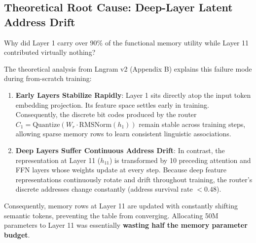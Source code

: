 \documentclass[11pt,a4paper]{article}
\begin{document}
\begin{table}[h!]
\centering
\small
\caption{Wave 1 Step-2000 Memory Zero-Out Sensitivity Probe (20M held-out tokens).}
\label{tab:probe_wave1}
\end{table}

\subsection{Theoretical Root Cause: Deep-Layer Latent Address Drift}
Why did Layer 1 carry over 90\% of the functional memory utility while Layer 11 contributed virtually nothing?

The theoretical analysis from Lngram v2 (Appendix B) explains this failure mode during from-scratch training:
\begin{enumerate}[leftmargin=1.4em, itemsep=2pt]
    \item \textbf{Early Layers Stabilize Rapidly}: Layer 1 sits directly atop the input token embedding projection. Its feature space settles early in training. Consequently, the discrete bit codes produced by the router $C_1 = \text{Quantize}(W_r \cdot \text{RMSNorm}(h_1))$ remain stable across training steps, allowing sparse memory rows to learn consistent linguistic associations.
    \item \textbf{Deep Layers Suffer Continuous Address Drift}: In contrast, the representation at Layer 11 ($h_{11}$) is transformed by 10 preceding attention and FFN layers whose weights update at every step. Because deep feature representations continuously rotate and drift throughout training, the router's discrete addresses change constantly (address survival rate $<0.48$).
\end{enumerate}
Consequently, memory rows at Layer 11 are updated with constantly shifting semantic tokens, preventing the table from converging. Allocating 50M parameters to Layer 11 was essentially \textbf{wasting half the memory parameter budget}.
\end{document}
